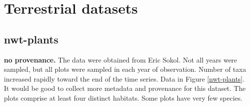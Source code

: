 \documentclass[11pt, oneside]{article}
\begin{document}
\section {Terrestrial datasets}

\subsection {nwt-plants}
{\bf no provenance.}
The data were obtained from Eric Sokol.
Not all years were sampled, but all plots were sampled in each year of observation. 
 Number of taxa increased rapidly toward the end of the time series. 
 Data in Figure \ref{nwt-plants}.
 It would be good to collect more metadata and provenance for this dataset.
 The plots comprise at least four distinct habitats.
 Some plots have very few species.
\end{document}
